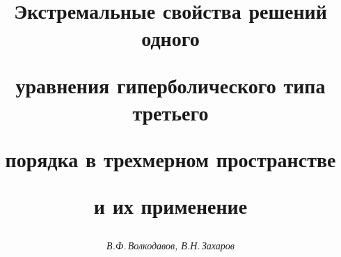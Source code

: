 

 




 


\newcommand{\A}{\cal A} 


\newcommand{\col}{\operatorname{col}} 


\newcommand{\vraisup}{\operatornamewithlimits{vrai~sup}} 


\newcommand{\tts}[1]{} 


 




  


\setcounter{page}{28} 












 


\author{\it В.Ф.\,Волкодавов, В.Н.\,Захаров} 




\title{Экстремальные свойства решений одного 


уравнения гиперболического типа третьего 


порядка в трехмерном пространстве  


и их применение} 


 


\date{} 




\pagestyle{plain} %


